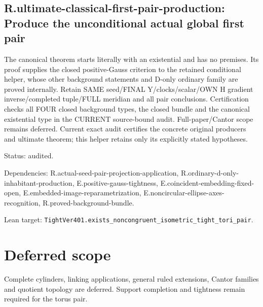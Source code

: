\documentclass{article}
\begin{document}
\subsection*{R.ultimate-classical-first-pair-production: Produce the unconditional actual global first pair}
The canonical theorem starts literally with an existential and has no premises. Its proof supplies the closed positive-Gauss criterion to the retained conditional helper, whose other background statements and D-only ordinary family are proved internally. Retain SAME seed/FINAL Y/clocks/scalar/OWN H gradient inverse/completed tuple/FULL meridian and all pair conclusions. Certification checks all FOUR closed background types, the closed bundle and the canonical existential type in the CURRENT source-bound audit. Full-paper/Cantor scope remains deferred. Current exact audit certifies the concrete original producers and ultimate theorem; this helper retains only its explicitly stated hypotheses.
\par Status: audited.
\par Dependencies: R.actual-seed-pair-projection-application, R.ordinary-d-only-inhabitant-production, E.positive-gauss-tightness, E.coincident-embedding-fixed-open, E.embedded-image-reparametrization, E.noncircular-ellipse-axes-recognition, R.proved-background-bundle.
\par Lean target: \texttt{TightVer401.exists\_noncongruent\_isometric\_tight\_tori\_pair}.
\section*{Deferred scope}
Complete cylinders, linking applications, general ruled extensions, Cantor families and quotient topology are deferred. Support completion and tightness remain required for the torus pair.
\end{document}
